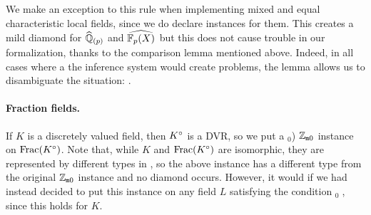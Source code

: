 \documentclass[sigplan,10pt, nonacm, review]{acmart}
\begin{document}
We make an exception to this rule when implementing mixed and equal characteristic local fields, since we do declare  instances for them. This creates a mild diamond for $\widehat{\mathbb{Q}}_{(p)}$ and $\FpXCompl$ but this does not cause trouble in our formalization, thanks to the comparison lemma \href{https://github.com/LCFT-Lean/local_fields/blob/76ad487d09babdb0018f394a5634526637ee014a/src/discrete_valuation_ring/trivial_extension.lean#L58}{\extlink} mentioned above. Indeed, in all cases where a the inference system would create problems, the lemma allows us to disambiguate the situation: .

\paragraph{Fraction fields.}
If $K$ is a discretely valued field, then ${K}^\circ$ is a DVR, so we put a \code{[valued (fraction_ring K}$_0$) $\mathbb{Z}_{\mathtt{m}0}$\code{]} instance on $\operatorname{Frac}({K}^\circ)$\href{https://github.com/LCFT-Lean/local_fields/blob/76ad487d09babdb0018f394a5634526637ee014a/src/discrete_valuation_ring/basic.lean#L452}{\extlink}. Note that, while $K$ and $\operatorname{Frac}({K}^\circ)$ are isomorphic, they are represented by different types in \mathlib, so the above  instance has a different type from the original \code{[valued K} $\mathbb{Z}_{\mathtt{m}0}$\code{]} instance and no diamond occurs. However, it would if we had instead decided to put this  instance on any field $L$ satisfying the condition \code{[is_fraction_ring K}$_0\; $\code{L]}, since this holds for $K$.
\end{document}
